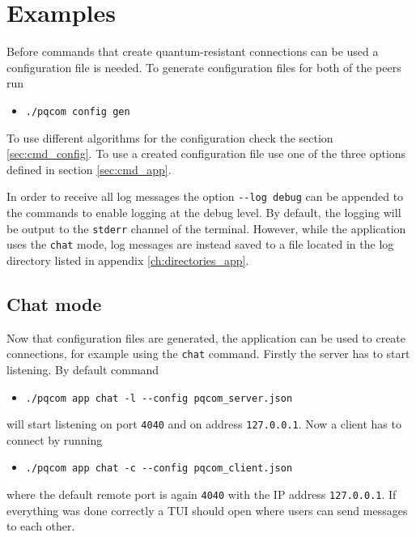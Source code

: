 \section{Examples}
Before commands that create quantum-resistant connections can be used a configuration file is needed. To generate configuration files for both of the peers run
\begin{itemize}
  \item \texttt{./pqcom config gen}
\end{itemize}
To use different algorithms for the configuration check the section \ref{sec:cmd_config}. To use a created configuration file use one of the three options defined in section \ref{sec:cmd_app}.

In order to receive all log messages the option \texttt{-\--log debug} can be appended to the commands to enable logging at the debug level. By default, the logging will be output to the \texttt{stderr} channel of the terminal. However, while the application uses the \texttt{chat} mode, log messages are instead saved to a file located in the log directory listed in appendix \ref{ch:directories_app}.

\subsection{Chat mode}
Now that configuration files are generated, the application can be used to create connections, for example using the \texttt{chat} command. Firstly the server has to start listening. By default command
\begin{itemize}
  \item \texttt{./pqcom app chat -l -\--config pqcom\_server.json}
\end{itemize}
will start listening on port \texttt{4040} and on address \texttt{127.0.0.1}. Now a client has to connect by running
\begin{itemize}
  \item \texttt{./pqcom app chat -c -\--config pqcom\_client.json}
\end{itemize}
where the default remote port is again \texttt{4040} with the IP address \texttt{127.0.0.1}. If everything was done correctly a TUI should open where users can send messages to each other.

